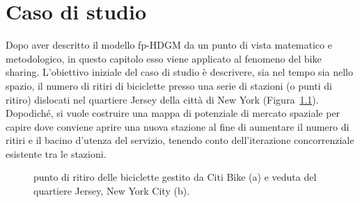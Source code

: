 \chapter[Caso di studio]{Caso di studio}

Dopo aver descritto il modello fp-HDGM da un punto di vista matematico e metodologico, in questo capitolo esso viene applicato al fenomeno del bike sharing. L'obiettivo iniziale del caso di studio è descrivere, sia nel tempo sia nello spazio, il numero di ritiri di biciclette presso una serie di stazioni (o punti di ritiro) dislocati nel quartiere Jersey della città di New York (Figura~\ref{presentazione_Jersey_City}). Dopodiché, si vuole costruire una mappa di potenziale di mercato spaziale per capire dove conviene aprire una nuova stazione al fine di aumentare il numero di ritiri e il bacino d'utenza del servizio, tenendo conto dell'iterazione concorrenziale esistente tra le stazioni.

\begin{figure}[b!]
	\centering
	\quad
	\quad
	\caption[Punto di ritiro delle biciclette e veduta del quartiere Jersey]{punto di ritiro delle biciclette gestito da Citi Bike (a) e veduta del quartiere Jersey, New York City (b).}
	\label{presentazione_Jersey_City}
\end{figure}

